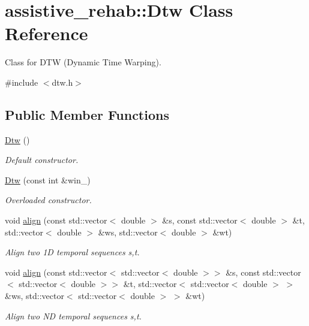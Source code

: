 \section{assistive\+\_\+rehab\+:\+:Dtw Class Reference}
\label{classassistive__rehab_1_1Dtw}


Class for D\+TW (Dynamic Time Warping).  




{\ttfamily \#include $<$dtw.\+h$>$}

\subsection*{Public Member Functions}
\begin{DoxyCompactItemize}
\item 
\mbox{\label{classassistive__rehab_1_1Dtw_a0d7ee684ba230b3c8289f7edd58b18da}} 
\hyperlink{classassistive__rehab_1_1Dtw_a0d7ee684ba230b3c8289f7edd58b18da}{Dtw} ()
\begin{DoxyCompactList}\small\item\em Default constructor. \end{DoxyCompactList}\item 
\hyperlink{classassistive__rehab_1_1Dtw_adb11d58b5482f14ade22f5f630a24843}{Dtw} (const int \&win\+\_\+)
\begin{DoxyCompactList}\small\item\em Overloaded constructor. \end{DoxyCompactList}\item 
void \hyperlink{classassistive__rehab_1_1Dtw_a0e3012c72cf4c10a53b914ea7f670e10}{align} (const std\+::vector$<$ double $>$ \&s, const std\+::vector$<$ double $>$ \&t, std\+::vector$<$ double $>$ \&ws, std\+::vector$<$ double $>$ \&wt)
\begin{DoxyCompactList}\small\item\em Align two 1D temporal sequences s,t. \end{DoxyCompactList}\item 
void \hyperlink{classassistive__rehab_1_1Dtw_ac63edfdf11768f9e74df20a952c538d3}{align} (const std\+::vector$<$ std\+::vector$<$ double $>$$>$ \&s, const std\+::vector$<$ std\+::vector$<$ double $>$$>$ \&t, std\+::vector$<$ std\+::vector$<$ double $>$ $>$ \&ws, std\+::vector$<$ std\+::vector$<$ double $>$ $>$ \&wt)
\begin{DoxyCompactList}\small\item\em Align two ND temporal sequences s,t. \end{DoxyCompactList}\item 

\end{DoxyCompactItemize}
